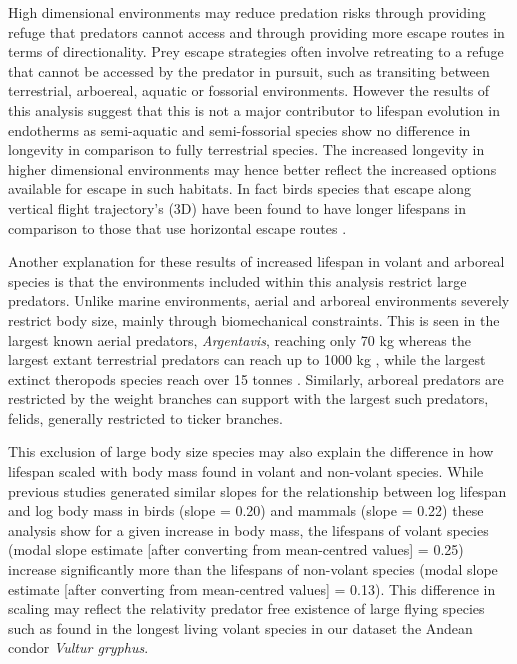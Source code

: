 High dimensional environments may reduce predation risks through providing refuge that predators cannot access and through providing more escape routes in terms of directionality. Prey escape strategies often involve retreating to a refuge that cannot be accessed by the predator in pursuit, such as transiting between terrestrial, arboereal, aquatic or fossorial environments. However the results of this analysis suggest that this is not a major contributor to lifespan evolution in endotherms as semi-aquatic and semi-fossorial species show no difference in longevity in comparison to fully terrestrial species. The increased longevity in higher dimensional environments may hence better reflect the increased options available for escape in such habitats. In fact birds species that escape along vertical flight trajectory's (3D) have been found to have longer lifespans in comparison to those that use horizontal escape routes \citep{moller2010up}. 


Another explanation for these results of increased lifespan in volant and arboreal species is that the environments included within this analysis restrict large predators. Unlike marine environments, aerial and arboreal environments severely restrict body size, mainly through biomechanical constraints. This is seen in the largest known aerial predators, \textit{Argentavis}, reaching only 70 kg \citep{chatterjee2007aerodynamics} whereas the largest extant terrestrial predators can reach up to 1000 kg \citep{carwardine1995guinness}, while the largest extinct theropods species reach over 15 tonnes \citep{therrien2007my}. Similarly, arboreal predators are restricted by the weight branches can support with the largest such predators, felids, generally restricted to ticker branches. 


This exclusion of large body size species may also explain the difference in how lifespan scaled with body mass found in volant and non-volant species. While previous studies generated similar slopes for the relationship between log lifespan and log body mass in birds (slope = 0.20) and mammals (slope = 0.22) \citep{lindstedt1981body,hulbert2007life} these analysis show for a given increase in body mass, the lifespans of volant species (modal slope estimate [after converting from mean-centred values] = 0.25) increase significantly more than the lifespans of non-volant species (modal slope estimate [after converting from mean-centred values] = 0.13). This difference in scaling may reflect the relativity predator free existence of large flying species such as found in the longest living volant species in our dataset the Andean condor \textit{Vultur gryphus}.


